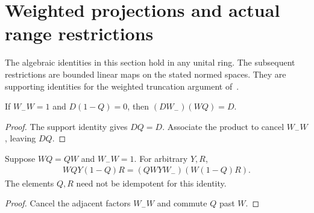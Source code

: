 \section{Weighted projections and actual range restrictions}

The algebraic identities in this section hold in any unital ring. The
subsequent restrictions are bounded linear maps on the stated normed spaces.
They are supporting identities for the weighted truncation argument
of~\cite[lines 1010--1024]{Arad2016RigorousRG}.

\begin{theorem}
    \label{thm:weighted_right_support_cancellation}
    \leanok
    If $W_-W=1$ and $D(1-Q)=0$, then $(DW_-)(WQ)=D$.
\end{theorem}
\begin{proof}
    \leanok
    The support identity gives $DQ=D$. Associate the product to cancel
    $W_-W$, leaving $DQ$.
\end{proof}

\begin{theorem}
    \label{thm:weighted_forcing_identity}
    \leanok
    Suppose $WQ=QW$ and $W_-W=1$. For arbitrary $Y,R$,
    \begin{align}
        WQY(1-Q)R=(QWYW_-)(W(1-Q)R).
        \label{eq:weighted_forcing_factorization}
    \end{align}
    The elements $Q,R$ need not be idempotent for this identity.
\end{theorem}
\begin{proof}
    \leanok
    Cancel the adjacent factors $W_-W$ and commute $Q$ past $W$.
\end{proof}

